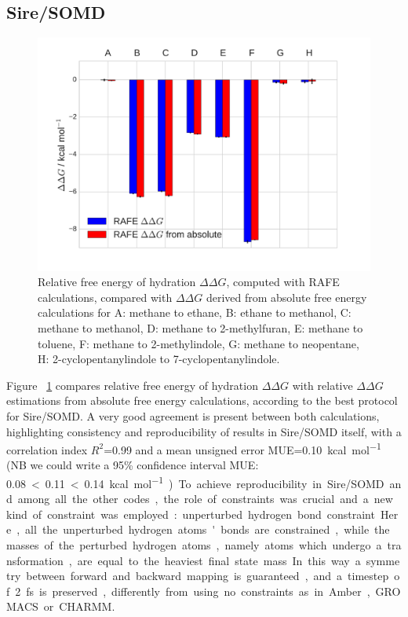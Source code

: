 \documentclass[journal=jctcce,manuscript=article]{achemso}
\begin{document}
\subsection{Sire/SOMD}
\label{sec:somd-results}
\begin{figure}[ht]
  \includegraphics[width=\textwidth]{figures/sire_histogram.pdf}
  \caption{Relative free energy of hydration $\Delta\Delta G$, computed with RAFE calculations, compared with $\Delta\Delta G$ derived from absolute free energy calculations for A: methane to ethane, B: ethane to methanol, C: methane to methanol, D: methane to 2-methylfuran, E: methane to toluene,
  F: methane to 2-methylindole, G: methane to neopentane, H: 2-cyclopentanylindole to 7-cyclopentanylindole.}
  \label{fig:sire_histogram}
\end{figure}


Figure ~\ref{fig:sire_histogram} compares relative free energy of hydration $\Delta\Delta G$ with relative $\Delta\Delta G$ estimations from absolute free energy calculations, according to the best protocol for Sire/SOMD. A very good agreement is present between both calculations, highlighting consistency and reproducibility of results in Sire/SOMD itself, with a correlation index $R^2$=\SI{0.99}{} and a mean unsigned error MUE=\SI{0.10}{kcal.mol^{-1}} 
(NB we could write a 95\% confidence interval MUE: \SI{0.08}< \SI{0.11} < \SI{0.14}{kcal.mol^{-1}})
To achieve reproducibility in Sire/SOMD and among all the other codes, the role of constraints was crucial and a new kind of constraint was employed: unperturbed hydrogen bond constraint. Here, all the unperturbed hydrogen atoms'bonds are constrained, while the masses of the perturbed hydrogen atoms, namely atoms which undergo a transformation, are equal to the heaviest final state mass. In this way a symmetry between forward and backward mapping is guaranteed, and a timestep of \SI{2}{fs} is preserved, differently from using no constraints as in Amber, GROMACS or CHARMM. 
\end{document}
